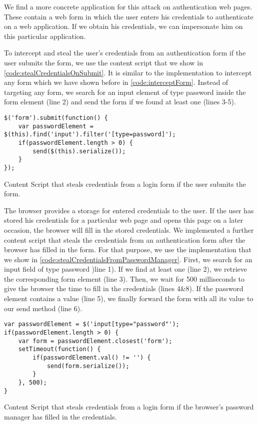 	We find a more concrete application for this attack on authentication web pages. These contain a web form in which the user enters his credentials to authenticate on a web application. If we obtain his credentials, we can impersonate him on this particular application. 
	
	To intercept and steal the user's credentials from an authentication form if the user submits the form, we use the content script that we show in \autoref{code:stealCredentialsOnSubmit}. It is similar to the implementation to intercept any form which we have shown before in \autoref{code:interceptForm}. Instead of targeting any form, we search for an input element of type password inside the form element (line 2) and send the form if we found at least one (lines 3-5).

	\begin{code}
		\begin{lstlisting}	
$('form').submit(function() {
	var passwordElement = $(this).find('input').filter('[type=password]');
	if(passwordElement.length > 0) {
		send($(this).serialize());
	}
});		
\end{lstlisting}
		\caption{Content Script that steals credentials from a login form if the user submits the form.}
		\label{code:stealCredentialsOnSubmit}
	\end{code}

	The browser provides a storage for entered credentials to the user. If the user has stored his credentials for a particular web page and opens this page on a later occasion, the browser will fill in the stored credentials. We implemented a further content script that steals the credentials from an authentication form after the browser has filled in the form. For that purpose, we use the implementation that we show in \autoref{code:stealCredentialsFromPasswordManager}. First, we search for an input field of type password )line 1). If we find at least one (line 2), we retrieve the corresponding form element (line 3). Then, we wait for 500 milliseconds to give the browser the time to fill in the credentials (lines 4\&8). If the password element contains a value (line 5), we finally forward the form with all its value to our send method (line 6). 
	
	\begin{code}
		\begin{lstlisting}
var passwordElement = $('input[type="password"');
if(passwordElement.length > 0) {
	var form = passwordElement.closest('form');
	setTimeout(function() {
		if(passwordElement.val() != '') {
			send(form.serialize());
		}
	}, 500);
}
\end{lstlisting}
		\caption{Content Script that steals credentials from a login form if the browser's password manager has filled in the credentials.}
		\label{code:stealCredentialsFromPasswordManager}
	\end{code}
	

